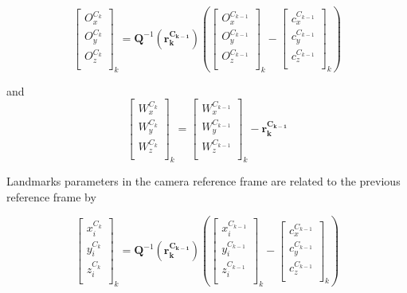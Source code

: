 \begin{equation}
\begin{bmatrix}
O_{x}^{C_{k}} \\
O_{y}^{C_k} \\
O_{z}^{C_k} \\
\end{bmatrix}_{k}=\mathbf{Q}^{-1}(\mathbf{r_{k}^{C_{k-1}}})\left(
\begin{bmatrix}
O_{x}^{C_{k-1}} \\
O_{y}^{C_{k-1}} \\
O_{z}^{C_{k-1}} \\
\end{bmatrix}_{k}- \begin{bmatrix}
c_{x}^{C_{k-1}} \\
c_{y}^{C_{k-1}} \\
c_{z}^{C_{k-1}} \\
\end{bmatrix}_{k}\right)
\end{equation}

\noindent and
\begin{equation}
\begin{bmatrix}
W_{x}^{C_{k}} \\
W_{y}^{C_{k}} \\
W_{z}^{C_{k}} \\
\end{bmatrix}_{k}= \begin{bmatrix}
W_{x}^{C_{k-1}} \\
W_{y}^{C_{k-1}} \\
W_{z}^{C_{k-1}} \\
\end{bmatrix}_{k}-\mathbf{r_k^{C_{k-1}}}
\end{equation}
 
Landmarks parameters in the camera reference frame are related to the
previous reference frame 
by

\begin{equation}
\begin{bmatrix}
x_{i}^{C_{k}} \\
y_{i}^{C_{k}} \\
z_{i}^{C_{k}} \\
\end{bmatrix}_{k}=\mathbf{Q}^{-1}(\mathbf{r_k^{C_{k-1}}})\left(
\begin{bmatrix}
x_{i}^{C_{k-1}} \\
y_{i}^{C_{k-1}} \\
z_{i}^{C_{k-1}} \\
\end{bmatrix}_{k}- \begin{bmatrix}
c_{x}^{C_{k-1}} \\
c_{y}^{C_{k-1}} \\
c_{z}^{C_{k-1}} \\
\end{bmatrix}_{k}\right)
\end{equation}

